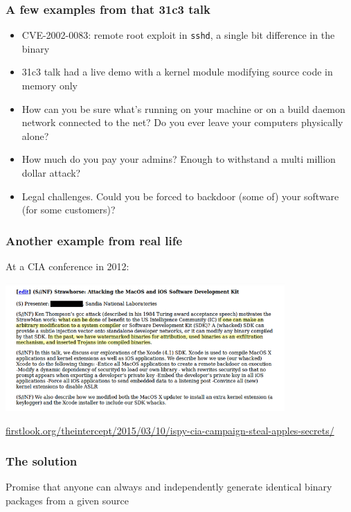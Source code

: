 \documentclass[14pt,aspectratio=169]{beamer}
\begin{document}
\begin{frame}[fragile]
 \frametitle{A few examples from that 31c3 talk}
 \begin{itemize}
  \item CVE-2002-0083: remote root exploit in \texttt{sshd}, a single bit difference in the binary
  \item<2-5> 31c3 talk had a live demo with a kernel module modifying source code in memory only
  \item<3-5> How can you be sure what's running on your machine or on a build
  daemon network connected to the net? Do you ever leave your computers
  physically alone? 
  \item<4-5> How much do you pay your admins? Enough to withstand a multi million
  dollar attack?
  \item<5> Legal challenges. Could you be forced to backdoor (some of) your
  software (for some customers)?
 \end{itemize}
\end{frame}

\begin{frame}[fragile]
 \frametitle{Another example from real life}

 At a CIA conference in 2012:
 \begin{center}
  \includegraphics[width=0.8\textwidth]{images/strawhorse.png}

  {\footnotesize
  \url{firstlook.org/theintercept/2015/03/10/ispy-cia-campaign-steal-apples-secrets/}
  }
 \end{center}
\end{frame}


\begin{frame}
 \frametitle{The solution}

 \begin{center}
 \Large{
 Promise that anyone can always and independently generate
 identical binary packages from a given source}
\end{center}
\end{frame}
\end{document}
